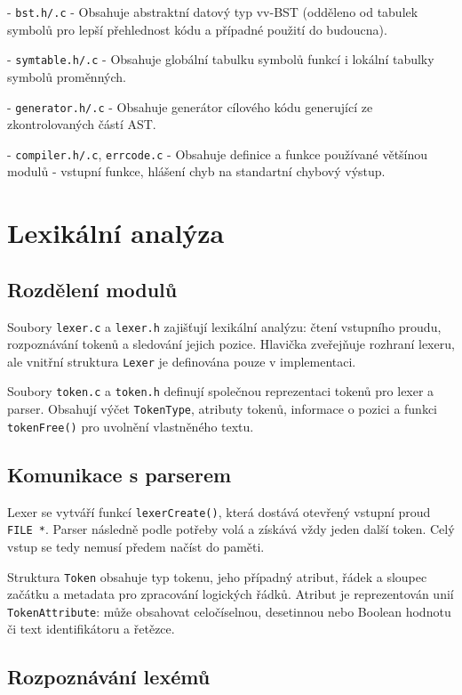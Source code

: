 \documentclass{article}
\begin{document}
- \texttt{bst.h/.c} - Obsahuje abstraktní datový typ vv-BST (odděleno od tabulek symbolů pro lepší přehlednost kódu a případné použití do budoucna).

- \texttt{symtable.h/.c} - Obsahuje globální tabulku symbolů funkcí i lokální tabulky symbolů proměnných.

- \texttt{generator.h/.c} - Obsahuje generátor cílového kódu generující ze zkontrolovaných částí AST.

- \texttt{compiler.h/.c}, \texttt{errcode.c} - Obsahuje definice a funkce používané většínou modulů - vstupní funkce, hlášení chyb na standartní chybový výstup.


\newpage

\section{Lexikální analýza}
\subsection{Rozdělení modulů}

Soubory \texttt{lexer.c} a \texttt{lexer.h} zajišťují lexikální analýzu: čtení vstupního proudu, rozpoznávání tokenů a sledování jejich pozice. Hlavička zveřejňuje rozhraní lexeru, ale vnitřní struktura \texttt{Lexer} je definována pouze v implementaci.

Soubory \texttt{token.c} a \texttt{token.h} definují společnou reprezentaci tokenů pro lexer a parser. Obsahují výčet \texttt{TokenType}, atributy tokenů, informace o pozici a funkci \texttt{tokenFree()} pro uvolnění vlastněného textu.

\subsection{Komunikace s parserem}

Lexer se vytváří funkcí \texttt{lexerCreate()}, která dostává otevřený vstupní proud \texttt{FILE *}. Parser následně podle potřeby volá  a získává vždy jeden další token. Celý vstup se tedy nemusí předem načíst do paměti.

Struktura \texttt{Token} obsahuje typ tokenu, jeho případný atribut, řádek a sloupec začátku a metadata pro zpracování logických řádků. Atribut je reprezentován unií \texttt{TokenAttribute}: může obsahovat celočíselnou, desetinnou nebo Boolean hodnotu či text identifikátoru a řetězce.

\subsection{Rozpoznávání lexémů}
\end{document}
